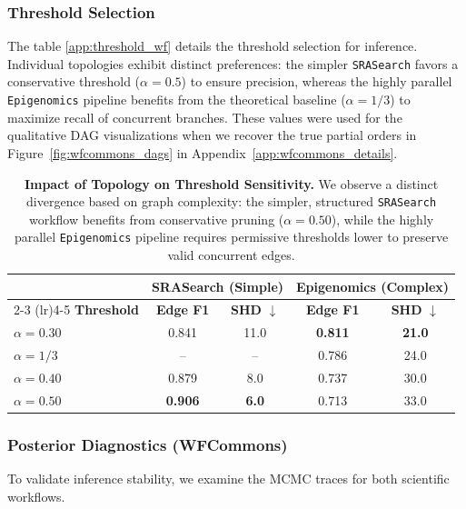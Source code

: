 \documentclass{article}
\theoremstyle{plain}
\theoremstyle{definition}
\theoremstyle{remark}
\begin{document}
\subsubsection{Threshold Selection}
The table \ref{app:threshold_wf} details the threshold selection for inference. 
\label{app:threshold_wf}
Individual topologies exhibit distinct preferences: the simpler \texttt{SRASearch} favors a conservative threshold ($\alpha=0.5$) to ensure precision, whereas the highly parallel \texttt{Epigenomics} pipeline benefits from the theoretical baseline ($\alpha=1/3$) to maximize recall of concurrent branches. These values were used for the qualitative DAG visualizations when we recover the true partial orders in Figure~\ref{fig:wfcommons_dags} in Appendix~\ref{app:wfcommons_details}.
\begin{table}[h!]
\centering
\caption{\textbf{Impact of Topology on Threshold Sensitivity.} We observe a distinct divergence based on graph complexity: the simpler, structured \texttt{SRASearch} workflow benefits from conservative pruning ($\alpha=0.50$), while the highly parallel \texttt{Epigenomics} pipeline requires permissive thresholds lower to preserve valid concurrent edges.}
\label{tab:wfcommons_sensitivity}
\small
\setlength{\tabcolsep}{5pt}
\begin{tabular}{l cc | cc}
\toprule
& \multicolumn{2}{c|}{\textbf{SRASearch} (Simple)} & \multicolumn{2}{c}{\textbf{Epigenomics} (Complex)} \\
\cmidrule(lr){2-3} \cmidrule(lr){4-5}
\textbf{Threshold} & \textbf{Edge F1} & \textbf{SHD} $\downarrow$ & \textbf{Edge F1} & \textbf{SHD} $\downarrow$ \\
\midrule
$\alpha=0.30$ & 0.841 & 11.0 & \textbf{0.811} & \textbf{21.0} \\
$\alpha=1/3$ & -- & -- & 0.786 & 24.0 \\
$\alpha=0.40$ & 0.879 & 8.0 & 0.737 & 30.0 \\
$\alpha=0.50$ & \textbf{0.906} & \textbf{6.0} & 0.713 & 33.0 \\
\bottomrule
\end{tabular}
\end{table}



\subsubsection{Posterior Diagnostics (WFCommons)}
To validate inference stability, we examine the MCMC traces for both scientific workflows. 
\end{document}
